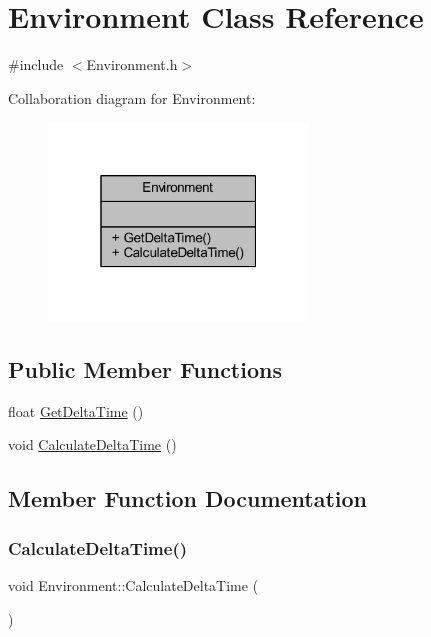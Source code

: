 \hypertarget{class_environment}{}\section{Environment Class Reference}
\label{class_environment}


{\ttfamily \#include $<$Environment.\+h$>$}



Collaboration diagram for Environment\+:
\nopagebreak
\begin{figure}[H]
\begin{center}
\leavevmode
\includegraphics[width=196pt]{class_environment__coll__graph}
\end{center}
\end{figure}
\subsection*{Public Member Functions}
\begin{DoxyCompactItemize}
\item 
float \mbox{\hyperlink{class_environment_a4444c726d8d25a102ad12721385e3c3b}{Get\+Delta\+Time}} ()
\item 
void \mbox{\hyperlink{class_environment_a1820a270c6d400963e8c26efe075c26d}{Calculate\+Delta\+Time}} ()
\end{DoxyCompactItemize}


\subsection{Member Function Documentation}
\mbox{\label{class_environment_a1820a270c6d400963e8c26efe075c26d}} 
\subsubsection{\texorpdfstring{Calculate\+Delta\+Time()}{CalculateDeltaTime()}}
{\footnotesize\ttfamily void Environment\+::\+Calculate\+Delta\+Time (\begin{DoxyParamCaption}{ }\end{DoxyParamCaption})}

